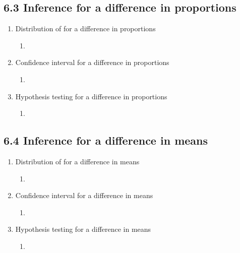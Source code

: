 \documentclass{article}
\begin{document}
\subsection{6.3 Inference for a difference in proportions}
\begin{enumerate}

\item Distribution of for a difference in proportions
\begin{enumerate}
\item
\end{enumerate}

\item Confidence interval for a difference in proportions
\begin{enumerate}
\item
\end{enumerate}

\item Hypothesis testing for a difference in proportions
\begin{enumerate}
\item
\end{enumerate}

\end{enumerate}


\subsection{6.4 Inference for a difference in means}
\begin{enumerate}

\item Distribution of for a difference in means
\begin{enumerate}
\item
\end{enumerate}

\item Confidence interval for a difference in means
\begin{enumerate}
\item
\end{enumerate}

\item Hypothesis testing for a difference in means
\begin{enumerate}
\item
\end{enumerate}

\end{enumerate}
\end{document}

